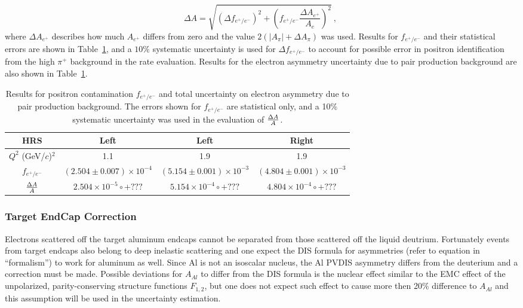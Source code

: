 \begin{equation}
 \Delta A = \sqrt{\left(\Delta f_{e^+/e^-}\right)^2+\left(f_{e^+/e^-}\frac{\Delta{A_{e^+}}}{A_e}\right)^2}~,~\label{eq:posbg}
\end{equation}
where $\Delta A_{e^+}$ describes how much $A_{e^+}$ differs from zero and the value 
$2(\vert A_\pi\vert +\Delta A_\pi)$ was used. Results for $f_{e^+/e^-}$ and their
statistical errors are shown in Table~\ref{tab:positronbg}, and a $10\%$ systematic uncertainty is used
for $\Delta f_{e^+/e^-}$ to account for possible error in positron identification from the high $\pi^+$ background 
in the rate evaluation.
Results for the electron asymmetry uncertainty due to pair production background 
are also shown in Table~\ref{tab:positronbg}.
\begin{table}
 \caption{Results for positron contamination $f_{e^+/e^-}$ and total uncertainty on electron asymmetry 
due to pair production background. The errors shown for $f_{e^+/e^-}$ are statistical only, and a 10\%
systematic uncertainty was used in the evaluation of $\Delta A\over A$.}\label{tab:positronbg}
\begin{tabular}{c|c|c|c}\hline
  HRS                 & Left & Left & Right\\\hline
  $Q^2$ (GeV/$c$)$^2$ & 1.1 & 1.9 & 1.9\\\hline
  $f_{e^+/e^-}$         & $(2.504\pm 0.007)\times 10^{-4}$ & $(5.154\pm 0.001)\times 10^{-3}$
                      & $(4.804\pm 0.001)\times 10^{-3}$\\\hline
  ${\Delta A}\over{A}$ & $2.504\times 10^{-5}\circ{+}???$ & $5.154\times 10^{-4}\circ{+}???$
                      & $4.804\times 10^{-4}\circ{+}???$ \\\hline
\end{tabular}
\end{table}


\subsubsection{Target EndCap Correction}

Electrons scattered off the target aluminum endcaps cannot be separated from those scattered off
the liquid deutrium. Fortunately events from target endcaps also belong to deep inelastic scattering
and one expect the DIS formula for asymmetries (refer to equation in ``formalism'') to work for aluminum
as well. Since Al is not an isoscalar nucleus, the Al PVDIS asymmetry differs from the deuterium and 
a correction must be made. 
Possible deviations for $A_{Al}$ to differ from the DIS formula is the nuclear effect similar to the EMC effect
of the unpolarized, parity-conserving structure functions $F_{1,2}$, but one does not expect such effect
to cause more then 20\% difference to $A_{Al}$ and this assumption will be used in the uncertainty estimation.

